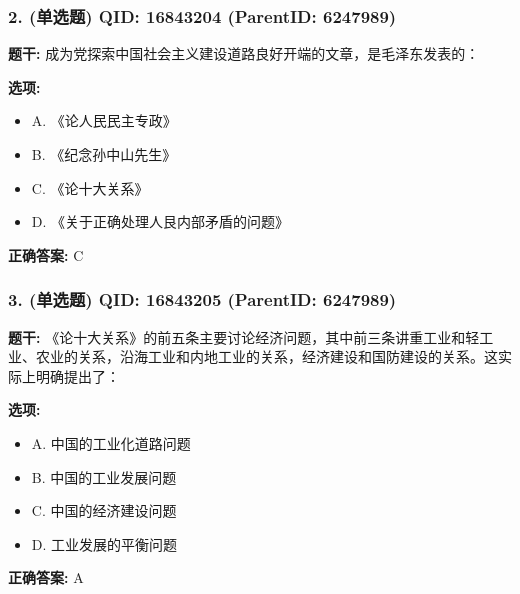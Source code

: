 \documentclass[12pt,UTF8]{ctexart}
\begin{document}
\subsubsection*{2. (单选题) \small QID: 16843204 (ParentID: 6247989)}

\textbf{题干:}
成为党探索中国社会主义建设道路良好开端的文章，是毛泽东发表的：



\textbf{选项:}
\begin{itemize}[leftmargin=*]

  \item A. 《论人民民主专政》

  \item B. 《纪念孙中山先生》

  \item C. 《论十大关系》

  \item D. 《关于正确处理人艮内部矛盾的问题》

\end{itemize}

\textbf{正确答案:}
C

\vspace{0.3em}\hrulefill\vspace{0.7em}

\subsubsection*{3. (单选题) \small QID: 16843205 (ParentID: 6247989)}

\textbf{题干:}
《论十大关系》的前五条主要讨论经济问题，其中前三条讲重工业和轻工业、农业的关系，沿海工业和内地工业的关系，经济建设和国防建设的关系。这实际上明确提出了：



\textbf{选项:}
\begin{itemize}[leftmargin=*]

  \item A. 中国的工业化道路问题

  \item B. 中国的工业发展问题

  \item C. 中国的经济建设问题

  \item D. 工业发展的平衡问题

\end{itemize}

\textbf{正确答案:}
A

\vspace{0.3em}\hrulefill\vspace{0.7em}
\end{document}
